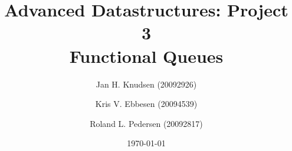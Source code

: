 \documentclass[a4paper, 12pt]{article}
\title{Advanced Datastructures: Project 3\\
Functional Queues}
\date{\today}
\author{Jan H. Knudsen (20092926)
\and
Kris V. Ebbesen (20094539)
\and
Roland L. Pedersen (20092817)
}
\begin{document}
\maketitle
\newpage
\tableofcontents
\newpage













\begin{thebibliography}{9}

\end{thebibliography}
\end{document}
